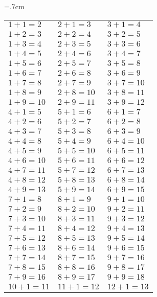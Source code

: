{\fontsize{9pt}{11pt}\selectfont
\begin{center}
\tabcolsep=.7cm
\begin{tabular}{|l|l|l|}
\hline
$1 + 1 = 2 $ & $ 2 + 1 = 3 $ & $ 3 + 1 = 4 $\\
$1 + 2 = 3 $ & $ 2 + 2 = 4 $ & $ 3 + 2 = 5 $\\
$1 + 3 = 4 $ & $ 2 + 3 = 5 $ & $ 3 + 3 = 6 $\\
$1 + 4 = 5 $ & $ 2 + 4 = 6 $ & $ 3 + 4 = 7 $\\
$1 + 5 = 6 $ & $ 2 + 5 = 7 $ & $ 3 + 5 = 8 $\\
$1 + 6 = 7 $ & $ 2 + 6 = 8 $ & $ 3 + 6 = 9 $\\
$1 + 7 = 8 $ & $ 2 + 7 = 9 $ & $ 3 + 7 = 10 $\\
$1 + 8 = 9 $ & $ 2 + 8 = 10 $ & $ 3 + 8 = 11 $\\
 $1 + 9 = 10 $ & $ 2 + 9 = 11 $ & $ 3 + 9 = 12 $\\
\hline
$4 + 1 = 5 $ & $ 5 + 1 = 6 $ & $ 6 + 1 = 7 $\\
$4 + 2 = 6 $ & $ 5 + 2 = 7 $ & $ 6 + 2 = 8 $\\
$4 + 3 = 7 $ & $ 5 + 3 = 8 $ & $ 6 + 3 = 9 $\\
$4 + 4 = 8 $ & $ 5 + 4 = 9 $ & $ 6 + 4 = 10 $\\
$4 + 5 = 9 $ & $ 5 + 5 = 10 $ & $ 6 + 5 = 11 $\\
$4 + 6 = 10 $ & $ 5 + 6 = 11 $ & $ 6 + 6 = 12 $\\
$4 + 7 = 11 $ & $ 5 + 7 = 12 $ & $ 6 + 7 = 13 $\\
$4 + 8 = 12 $ & $ 5 + 8 = 13 $ & $ 6 + 8 = 14 $\\
$4 + 9 = 13 $ & $ 5 + 9 = 14 $ & $ 6 + 9 = 15 $\\
\hline
$7 + 1 = 8 $ & $ 8 + 1 = 9 $ & $ 9 + 1 = 10 $\\
$7 + 2 = 9 $ & $ 8 + 2 = 10 $ & $ 9 + 2 = 11 $\\
$7 + 3 = 10 $ & $ 8 + 3 = 11 $ & $ 9 + 3 = 12 $\\
$7 + 4 = 11 $ & $ 8 + 4 = 12 $ & $ 9 + 4 = 13 $\\
$7 + 5 = 12 $ & $ 8 + 5 = 13 $ & $ 9 + 5 = 14 $\\
$7 + 6 = 13 $ & $ 8 + 6 = 14 $ & $ 9 + 6 = 15 $\\
$7 + 7 = 14 $ & $ 8 + 7 = 15 $ & $ 9 + 7 = 16 $\\
$7 + 8 = 15 $ & $ 8 + 8 = 16 $ & $ 9 + 8 = 17 $\\
$7 + 9 = 16 $ & $ 8 + 9 = 17 $ & $ 9 + 9 = 18 $\\
\hline
$10 + 1 = 11 $ & $ 11 + 1 = 12 $ & $ 12 + 1 =  13$\\

\end{tabular}
\end{center}}
